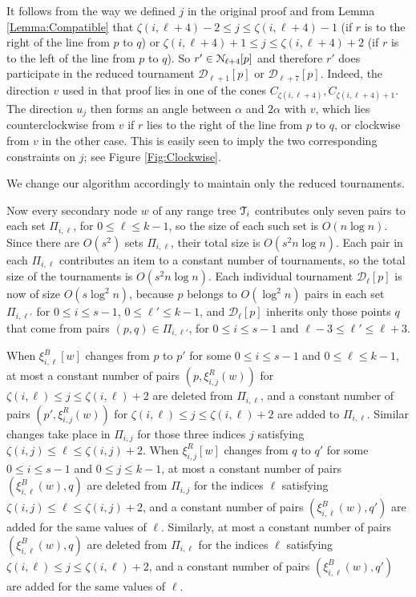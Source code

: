 \documentclass[letter,11pt]{article}
\def\NN{\EuScript{N}}
\def\dirtour{{\mathcal D}}
\def\T{\EuScript{T}}
\begin{document}
It follows from the way we defined $j$ in the original proof and from Lemma \ref{Lemma:Compatible} 
that $\zeta(i,\ell+4)-2\le j \le \zeta(i,\ell+4)-1$ 
(if $r$ is to the
right of the line from $p$ to $q$)
or $\zeta(i,\ell+4)+1\le j \le \zeta(i,\ell+4)+2$ (if $r$ is to the
left of the line from $p$ to $q$). 
So  $r' \in \NN_{\ell+4}[p]$ and therefore $r'$ does participate in the reduced tournament $\dirtour_{\ell+1}[p]$ or $\dirtour_{\ell+7}[p]$.
Indeed, the direction $v$ used in that proof lies in one of the cones $C_{\zeta(i,\ell+4)}, C_{\zeta(i,\ell+4)+1}$. The direction $u_j$ then forms an angle between $\alpha$ and $2\alpha$ with $v$, which lies counterclockwise from $v$ if $r$ lies to the right of the line from $p$ to $q$, or clockwise from $v$ in the other case. This is easily seen to imply the two corresponding constraints on $j$; see Figure \ref{Fig:Clockwise}.



We change our algorithm accordingly to maintain only the reduced tournaments. 

Now every secondary node $w$ of any range tree $\T_i$ contributes only seven pairs to each set
$\Pi_{i,\ell}$, for $0\leq \ell\leq k-1$, so the size of each such set is $O(n\log n)$. Since there
are $O(s^2)$ sets $\Pi_{i,\ell}$, their total size is $O(s^2 n\log
n)$.  Each pair in each $\Pi_{i,\ell}$ contributes an item to a constant
number of tournaments, so the total size of the tournaments is 
$O(s^2 n \log n)$.  Each individual tournament $\dirtour_{\ell}[p]$ is now
of size $O(s\log^2n)$, because $p$ belongs to $O(\log^2 n)$ pairs in each
set $\Pi_{i,\ell'}$ for $0\le i\le s-1$, $0\leq \ell'\leq k-1$, and $\dirtour_\ell[p]$ inherits only those points $q$ that come from pairs $(p,q)\in \Pi_{i,\ell'}$, for $0\leq i\leq s-1$ and $\ell-3\leq \ell'\leq \ell+3$.

When $\xi_{i,\ell}^B[w]$
 changes from $p$ to $p'$ for some $0\le i\le s-1$ and $0\le \ell \le
k-1$, at most a constant number of pairs
$(p,\xi_{i,j}^R(w))$ for $\zeta(i,\ell)\leq j\leq \zeta(i,\ell)+2$
are deleted from $\Pi_{i,\ell}$, and a constant number of pairs
$(p',\xi_{i,j}^R(w))$ for $\zeta(i,\ell)\leq j\leq \zeta(i,\ell)+2$
are added to $\Pi_{i,\ell}$.
Similar changes take place in $\Pi_{i,j}$ for those three indices $j$ satisfying
$\zeta(i,j)\leq \ell \leq \zeta(i,j)+2$. 
When $\xi_{i,j}^R[w]$ 
changes from $q$ to $q'$ for
some $0\leq i \le s-1$ and $0\le j \leq k-1$,
at most a constant number of pairs $(\xi_{i,\ell}^B(w),q)$ are deleted
from $\Pi_{i,j}$ for the indices $\ell$ satisfying $\zeta(i,j)\leq \ell \leq
\zeta(i,j)+2$, and a constant number of pairs
$(\xi_{i,\ell}^B(w),q')$ are added for the same values of
$\ell$.  Similarly,
at most a constant number of pairs $(\xi_{i,\ell}^B(w),q)$ are deleted
from $\Pi_{i,\ell}$ for the indices $\ell$ satisfying $\zeta(i,\ell)\leq j\leq
\zeta(i,\ell)+2$, and a constant number of pairs
$(\xi_{i,\ell}^B(w),q')$ are added for the same values of
$\ell$.
\end{document}
